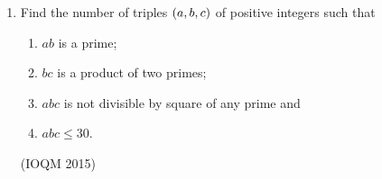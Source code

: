 \begin{enumerate}
	\item Find the number of triples $\left(a, b, c\right)$ of positive integers such that
	\begin{enumerate}
		\item $ab$ is a prime;
		\item $bc$ is a product of two primes;
		\item $abc$ is not divisible by square of any prime and
		\item $abc \leq 30$.
	\end{enumerate}\hfill(IOQM 2015)

\end{enumerate}

